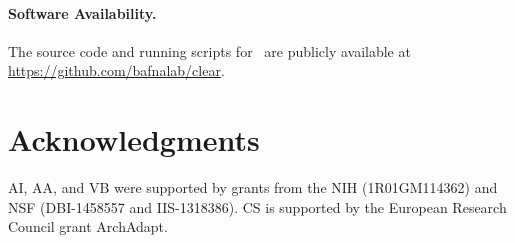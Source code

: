 \paragraph{Software Availability.}
The source code and running scripts for \comale\ are publicly available at 
\href{https://github.com/bafnalab/clear}{https://github.com/bafnalab/clear}.

\section*{Acknowledgments}
AI, AA, and VB were supported by grants from the NIH (1R01GM114362) and
NSF (DBI-1458557 and IIS-1318386). CS is supported by the European Research 
Council grant ArchAdapt.
